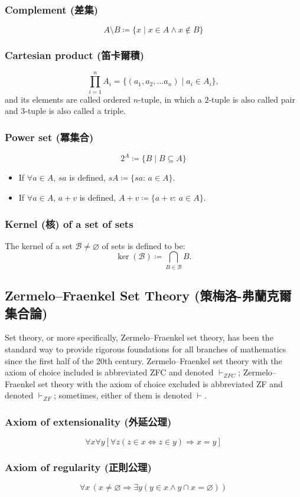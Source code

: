 \documentclass[a4paper,12pt]{article}
\begin{document}
\subsubsection{Complement (差集)}
\[A\setminus B\coloneq\{x\mid x\in A \land x\notin B\}\]
\subsubsection{Cartesian product (笛卡爾積)}
\[\prod_{i=1}^nA_i=\{(a_1,a_2,\ldots a_n)\mid a_i\in A_i\},\]
and its elements are called ordered $n$-tuple, in which a $2$-tuple is also called pair and $3$-tuple is also called a triple.
\subsubsection{Power set (冪集合)}
\[2^A\coloneq\{B\mid B\subseteq A\}\]
\begin{itemize}
\item If $\forall a\in A$, $sa$ is defined, $sA\coloneq\{sa:\,a\in A\}$.
\item If $\forall a\in A$, $a+v$ is defined, $A+v\coloneq\{a+v:\,a\in A\}$.
\end{itemize}
\subsubsection{Kernel (核) of a set of sets}
The kernel of a set $\mathcal {B}\neq \varnothing$ of sets is defined to be:
\[\ker(\mathcal {B})\coloneq\bigcap_{B\in\mathcal {B}}B.\]
\subsection{Zermelo–Fraenkel Set Theory (策梅洛-弗蘭克爾集合論)}
Set theory, or more specifically, Zermelo–Fraenkel set theory, has been the standard way to provide rigorous foundations for all branches of mathematics since the first half of the 20th century. Zermelo–Fraenkel set theory with the axiom of choice included is abbreviated ZFC and denoted $\vdash_{ZFC}$; Zermelo–Fraenkel set theory with the axiom of choice excluded is abbreviated ZF and denoted $\vdash_{ZF}$; sometimes, either of them is denoted $\vdash$.
\subsubsection{Axiom of extensionality (外延公理)}
\[\forall x\forall y[\forall z(z\in x\Leftrightarrow z\in y)\Rightarrow x=y]\]
\subsubsection{Axiom of regularity (正則公理)}
\[\forall x\,(x\neq \varnothing \Rightarrow \exists y(y\in x\land y\cap x=\varnothing ))\]
\end{document}
